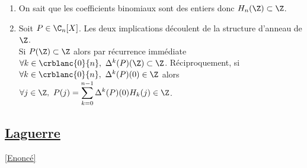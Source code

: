 \documentclass{book}
\begin{document}
\begin{enumerate}[leftmargin=*]
\begin{itemize}
		\end{itemize}
		\item On sait que les coefficients binomiaux sont des entiers donc $H_n(\Z)\subset \Z$.
		\item Soit $P\in \C_n[X]$. Les deux implications découlent de la structure d'anneau de $\Z$.\\
		Si $P(\Z)\subset \Z$ alors par récurrence immédiate $\forall k\in \crblanc{0}{n},\ \Delta^k(P)(\Z)\subset \Z$. Réciproquement, si $\forall k\in \crblanc{0}{n},\ \Delta^k(P)(0)\in \Z$ alors $\forall j\in \Z,\ P(j)=\displaystyle\sum_{k=0}^{n-1}\Delta^k(P)(0)H_k(j)\in \Z$.
	\end{enumerate}
	
	\subsection{\underline{Laguerre} }
	\label{sec:Laguerre}
	\textcolor{blue}{\hyperref[Laguerre]{[Enoncé]}}\\
\end{document}
